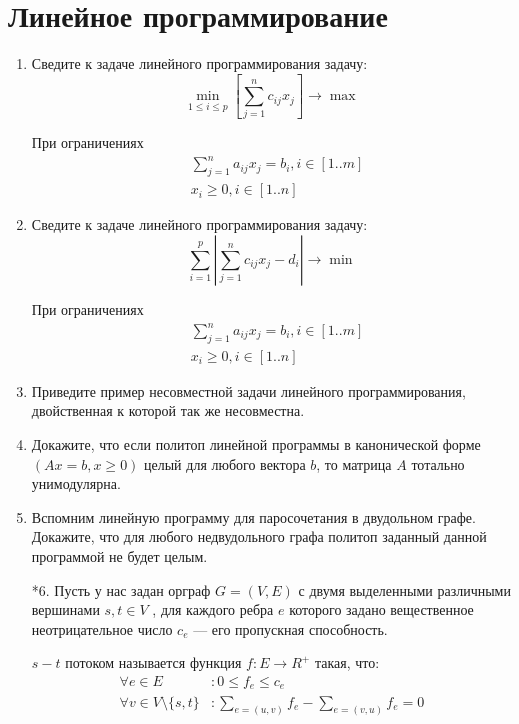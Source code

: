 \section*{Линейное программирование}
\begin{enumerate}
	\item Сведите к задаче линейного программирования задачу:
	\begin{equation*}
		\min\limits_{1 \leqslant i \leqslant p} \left[ \sum\limits_{j = 1}^n c_{ij} x_j \right] \to \max
	\end{equation*}
	
	При ограничениях 
	\begin{align*}
		& \sum\limits_{j = 1}^n a_{ij} x_j = b_i, i \in [1..m] \\
		& x_i \geqslant 0, i \in [1..n]
	\end{align*}
	
	\item Сведите к задаче линейного программирования задачу:
	\begin{equation*}
	\sum\limits_{i = 1}^p \left|\sum\limits_{j = 1}^n c_{ij}x_j - d_i\right| \to \min
	\end{equation*}
	
	При ограничениях 
	\begin{align*}
	& \sum\limits_{j = 1}^n a_{ij} x_j = b_i, i \in [1..m] \\
	& x_i \geqslant 0, i \in [1..n]
	\end{align*}
	
	\item Приведите пример несовместной задачи линейного программирования, двойственная к которой так же 
	несовместна.
	
	\item Докажите, что если политоп линейной программы в канонической форме $(Ax = b, x \geqslant 0)$ целый для 
	любого вектора $b$, то матрица $A$ тотально унимодулярна.
	
	\item Вспомним линейную программу для паросочетания в двудольном графе. Докажите, что для любого 
	недвудольного графа политоп заданный данной программой не будет целым.
	
	\item[*6.] Пусть у нас задан орграф $G = (V, E)$ с двумя выделенными различными вершинами $s, t \in V$ , для 
	каждого ребра $e$ которого задано вещественное неотрицательное число $c_e$ — его пропускная способность.
	
	$s-t$ потоком называется функция $f : E \to R^+$ такая, что:
	\begin{align*}
		\forall e \in E&: 0 \leqslant f_e \leqslant c_e \\
		\forall v \in V \setminus \{s, t\} &: \sum\limits_{e = (u,v)} f_e - \sum\limits_{e = (v,u)} f_e = 0
	\end{align*}
	

\end{enumerate}
